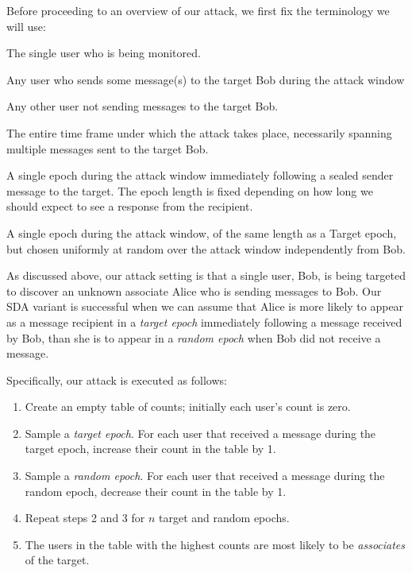 Before proceeding to an overview of our attack, we first fix the terminology we will use:
\begin{description}[noitemsep]
  \item[Target/Bob] The single user who is being monitored.
  \item[Associate/Alice] Any user who sends some message(s) to the target Bob during the attack window
  \item[Non-associate/Charlie] Any other user not sending messages to the target Bob.
  \item[Attack window] The entire time frame under which the attack
    takes place, necessarily spanning multiple messages sent to the target
    Bob.
  \item[Target epoch] A single epoch during the attack window
    immediately following a sealed sender message to the target. The epoch
    length is fixed depending on how long we should expect to see a
    response from the recipient.
  \item[Random epoch] A single epoch during the attack window,
    of the same length as a Target epoch,
    but chosen uniformly at random over the attack window independently
    from Bob.
\end{description}

As discussed above, our attack setting is that a single
user, Bob, is being targeted to discover an unknown associate Alice who
is sending messages to Bob. Our SDA variant is successful when we can
assume that Alice is more likely to appear as a message recipient in a
\emph{target epoch} immediately following a message received by Bob,
than she is to appear in a \emph{random epoch} when Bob did not receive
a message.

Specifically, our attack is executed as follows:
\begin{enumerate}[nosep]
  \item Create an empty table of counts; initially each user's count
  is zero.
  \item Sample a \emph{target epoch}. For each user that received a
  message during the target epoch, increase their count in the table by 1.
  \item Sample a \emph{random epoch}. For each user that received a
  message during the random epoch, decrease their count in the table by 1.
  \item Repeat steps 2 and 3 for $n$ target and random epochs.
  \item The users in the table with the highest counts are most likely
  to be \emph{associates} of the target.
\end{enumerate}

